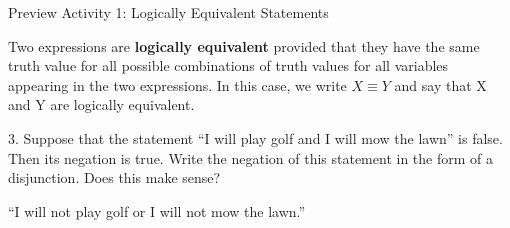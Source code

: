 \documentclass{beamer}
\begin{document}
\begin{frame}{Preview Activity 1: Logically Equivalent Statements}
	\begin{definition}
		Two expressions are \textbf{logically equivalent} provided that they have
		the same truth value for all possible combinations of truth values for all variables
		appearing in the two expressions. In this case, we write $X \equiv Y$ and say
		that X and Y are logically equivalent.
	\end{definition}
	3. Suppose that the statement ``I will play golf and I will mow the lawn'' is false.
	Then its negation is true. Write the negation of this statement in the form of
	a disjunction. Does this make sense?\\[.1 in] \pause
	
	``I will not play golf or I will not mow the lawn.''
\end{frame}

\end{document}
